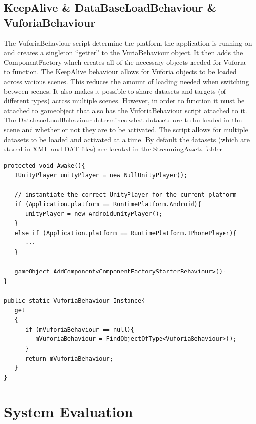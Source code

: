 \section{KeepAlive \& DataBaseLoadBehaviour \& VuforiaBehaviour}
The VuforiaBehaviour script determine the platform the application is running on and creates a singleton “getter” to the VuriaBehaviour object. It then adds the ComponentFactory which creates all of the necessary objects needed for Vuforia to function.   
The KeepAlive behaviour allows for Vuforia objects to be loaded across various scenes. This reduces the amount of loading needed when switching between scenes. It also makes it possible to share datasets and targets (of different types) across multiple scenes. However, in order to function it must be attached to gameobject that also has the VuforiaBehaviour script attached to it. The DatabaseLoadBehaviour determines what datasets are to be loaded in the scene and whether or not they are to be activated. The script allows for multiple datasets to be loaded and activated at a time. By default the datasets (which are stored in XML and DAT files) are located in the StreamingAssets folder.

\begin{lstlisting}
protected void Awake(){
   IUnityPlayer unityPlayer = new NullUnityPlayer();
   
   // instantiate the correct UnityPlayer for the current platform
   if (Application.platform == RuntimePlatform.Android){
      unityPlayer = new AndroidUnityPlayer();
   }
   else if (Application.platform == RuntimePlatform.IPhonePlayer){
      ...
   }
   
   gameObject.AddComponent<ComponentFactoryStarterBehaviour>();
}
   
public static VuforiaBehaviour Instance{
   get
   {
      if (mVuforiaBehaviour == null){
         mVuforiaBehaviour = FindObjectOfType<VuforiaBehaviour>();
      }
      return mVuforiaBehaviour;
   }
}
\end{lstlisting}

\chapter{System Evaluation}
